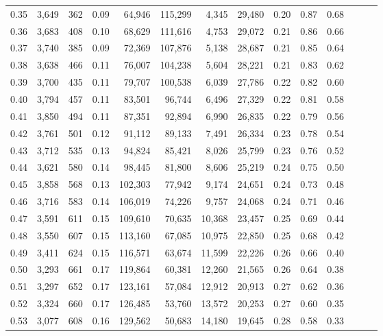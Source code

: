 \begin{tabular}{rrrrrrrrrrrrrr}
0.35 &  3,649 &  362 &  0.09 &   64,946 &  115,299 &   4,345 &  29,480 &  0.20 &  0.87 &      0.68 \\
0.36 &  3,683 &  408 &  0.10 &   68,629 &  111,616 &   4,753 &  29,072 &  0.21 &  0.86 &      0.66 \\
0.37 &  3,740 &  385 &  0.09 &   72,369 &  107,876 &   5,138 &  28,687 &  0.21 &  0.85 &      0.64 \\
0.38 &  3,638 &  466 &  0.11 &   76,007 &  104,238 &   5,604 &  28,221 &  0.21 &  0.83 &      0.62 \\
0.39 &  3,700 &  435 &  0.11 &   79,707 &  100,538 &   6,039 &  27,786 &  0.22 &  0.82 &      0.60 \\
0.40 &  3,794 &  457 &  0.11 &   83,501 &   96,744 &   6,496 &  27,329 &  0.22 &  0.81 &      0.58 \\
0.41 &  3,850 &  494 &  0.11 &   87,351 &   92,894 &   6,990 &  26,835 &  0.22 &  0.79 &      0.56 \\
0.42 &  3,761 &  501 &  0.12 &   91,112 &   89,133 &   7,491 &  26,334 &  0.23 &  0.78 &      0.54 \\
0.43 &  3,712 &  535 &  0.13 &   94,824 &   85,421 &   8,026 &  25,799 &  0.23 &  0.76 &      0.52 \\
0.44 &  3,621 &  580 &  0.14 &   98,445 &   81,800 &   8,606 &  25,219 &  0.24 &  0.75 &      0.50 \\
0.45 &  3,858 &  568 &  0.13 &  102,303 &   77,942 &   9,174 &  24,651 &  0.24 &  0.73 &      0.48 \\
0.46 &  3,716 &  583 &  0.14 &  106,019 &   74,226 &   9,757 &  24,068 &  0.24 &  0.71 &      0.46 \\
0.47 &  3,591 &  611 &  0.15 &  109,610 &   70,635 &  10,368 &  23,457 &  0.25 &  0.69 &      0.44 \\
0.48 &  3,550 &  607 &  0.15 &  113,160 &   67,085 &  10,975 &  22,850 &  0.25 &  0.68 &      0.42 \\
0.49 &  3,411 &  624 &  0.15 &  116,571 &   63,674 &  11,599 &  22,226 &  0.26 &  0.66 &      0.40 \\
0.50 &  3,293 &  661 &  0.17 &  119,864 &   60,381 &  12,260 &  21,565 &  0.26 &  0.64 &      0.38 \\
0.51 &  3,297 &  652 &  0.17 &  123,161 &   57,084 &  12,912 &  20,913 &  0.27 &  0.62 &      0.36 \\
0.52 &  3,324 &  660 &  0.17 &  126,485 &   53,760 &  13,572 &  20,253 &  0.27 &  0.60 &      0.35 \\
0.53 &  3,077 &  608 &  0.16 &  129,562 &   50,683 &  14,180 &  19,645 &  0.28 &  0.58 &      0.33 \\

\end{tabular}
